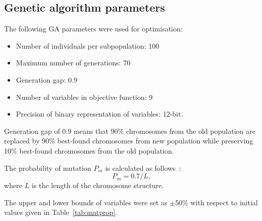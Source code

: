 \documentclass[preprint,12pt]{elsarticle}
\begin{document}
	\subsection{Genetic algorithm parameters}
	The following GA parameters were used for optimisation:
	\begin{itemize}
		\item Number of individuals per subpopulation: 100
		\item Maximum number of generations: 70
		\item Generation gap: 0.9
		\item Number of variables in objective function: 9
		\item Precision of binary representation of variables: 12-bit.
   \end{itemize}
    Generation gap of 0.9 means that 90\% chromosomes from the old population are replaced by 90\% best-found chromosomes from new population while preserving 10\% best-found chromosomes from the old population.
    
    The probability of mutation \(P_m\) is calculated as follows~\cite{Chipperfield1994}:
    \begin{equation}
    	P_m = 0.7/L,
    \end{equation}
    where \(L\) is the length of the chromosome structure.
    
	The upper and lower bounds of variables were set as \(\pm\)50\% with respect to initial values given in Table~\ref{tab:matprop}.
\end{document}
